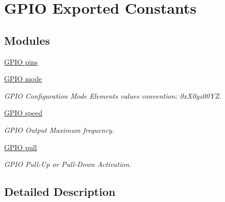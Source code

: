 \hypertarget{group___g_p_i_o___exported___constants}{}\section{G\+P\+IO Exported Constants}
\label{group___g_p_i_o___exported___constants}
\subsection*{Modules}
\begin{DoxyCompactItemize}
\item 
\hyperlink{group___g_p_i_o__pins}{G\+P\+I\+O pins}
\item 
\hyperlink{group___g_p_i_o__mode}{G\+P\+I\+O mode}
\begin{DoxyCompactList}\small\item\em G\+P\+IO Configuration Mode Elements values convention\+: 0x\+X0yz00\+YZ. \end{DoxyCompactList}\item 
\hyperlink{group___g_p_i_o__speed}{G\+P\+I\+O speed}
\begin{DoxyCompactList}\small\item\em G\+P\+IO Output Maximum frequency. \end{DoxyCompactList}\item 
\hyperlink{group___g_p_i_o__pull}{G\+P\+I\+O pull}
\begin{DoxyCompactList}\small\item\em G\+P\+IO Pull-\/\+Up or Pull-\/\+Down Activation. \end{DoxyCompactList}\end{DoxyCompactItemize}


\subsection{Detailed Description}
